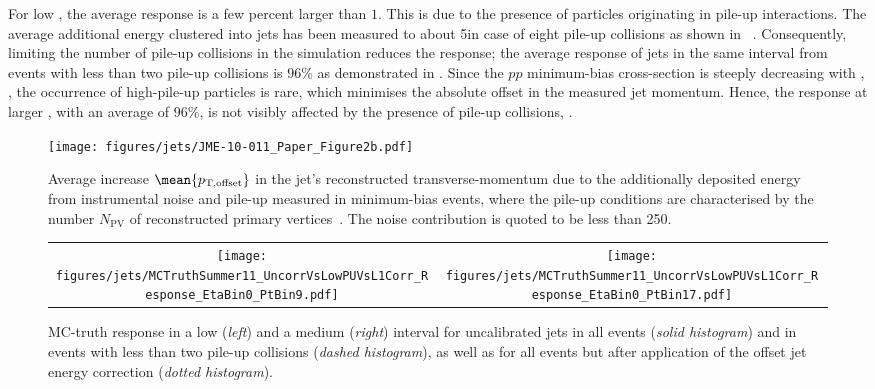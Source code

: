 For low \ptgen, the average response is a few percent larger than $1$.
This is due to the presence of particles originating in pile-up interactions.
The average additional energy clustered into jets has been measured to about 5\gev in case of eight pile-up collisions as shown in ~\cite{1748-0221-6-11-P11002}.
Consequently, limiting the number of pile-up collisions in the simulation reduces the response; the average response of jets in the same \ptgen interval from events with less than two pile-up collisions is $96\%$ as demonstrated in .
Since the $pp$ minimum-bias  cross-section is steeply decreasing with \pt, \cf {}, the occurrence of high-\pt pile-up particles is rare, which minimises the absolute offset in the measured jet momentum.
Hence, the response at larger \ptgen, with an average of $96\%$, is not visibly affected by the presence of pile-up collisions, \cf {}.
\begin{figure}[!ht]
  \centering
  \texttt{[image: figures/jets/JME-10-011\_Paper\_Figure2b.pdf]}
  \caption{Average increase $\mean{p_{\text{T,offset}}}$ in the jet's reconstructed transverse-momentum due to the additionally deposited energy from instrumental noise and pile-up measured in minimum-bias events, where the pile-up conditions are characterised by the number $N_{\text{PV}}$ of reconstructed primary vertices~\cite{1748-0221-6-11-P11002}.
The noise contribution is quoted to be less than 250\mev.
}
  \label{fig:Jets:Response:OffsetMomentum}
\end{figure}
\begin{figure}[!ht]
  \centering
  \begin{tabular}{cc}
    \texttt{[image: figures/jets/MCTruthSummer11\_UncorrVsLowPUVsL1Corr\_Response\_EtaBin0\_PtBin9.pdf]} &
    \texttt{[image: figures/jets/MCTruthSummer11\_UncorrVsLowPUVsL1Corr\_Response\_EtaBin0\_PtBin17.pdf]} \\
  \end{tabular}
  \caption{MC-truth response in a low (\textit{left}) and a medium (\textit{right}) \ptgen interval for uncalibrated jets in all events (\textit{solid histogram}) and in events with less than two pile-up collisions (\textit{dashed histogram}), as well as for all events but after application of the offset jet energy correction (\textit{dotted histogram}).}
\label{fig:Jets:Response:UncorrectedResponseDistributionNoPU}
\end{figure}

